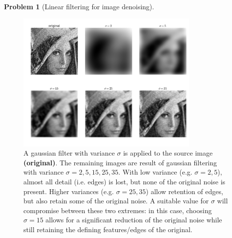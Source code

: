 \documentclass[10pt]{article}
\theoremstyle{plain}
\theoremstyle{definition}
\newtheorem{prob}{Problem}
\numberwithin{equation}{section}
\begin{document}
\begin{prob}[Linear filtering for image denoising]
\begin{figure}[p]
    \begin{center}
        \includegraphics[width=0.8\textwidth]{varspread}
        \caption{
            A gaussian filter with variance $\sigma$ is applied to the source image \textbf{(original)}.
            The remaining images are result of gaussian filtering with variance
            $\sigma=2,5,15,25,35$. With low variance (e.g. $\sigma=2,5$),
            almost all detail (i.e. edges) is lost, but none of the original noise is present.
            Higher variances (e.g. $\sigma=25,35$) allow retention of edges, but also retain some of the
            original noise. A suitable value for $\sigma$ will compromise between these two extremes:
            in this case, choosing $\sigma=15$ allows for a significant reduction of the original noise
            while still retaining the defining features/edges of the original.
        }
    \end{center}
\end{figure}


\end{prob}
\end{document}
